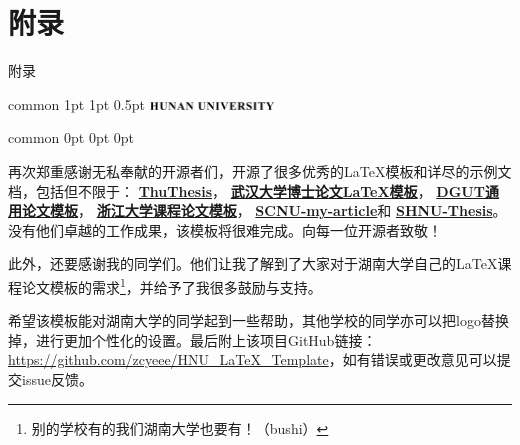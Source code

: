 \documentclass[
    report,     %
    oneside,    %
    UTF8,       %
    zihao=-4    %
]{config} %
\begin{document}



\begin{references}
\end{references}


\StartAppendix %

\chapter{附录}

附录


\Header
    {common} %
    {1pt} %
    {1pt} %
    {0.5pt} %
    {} %
    {\includegraphics[width=0.25\textwidth]{figures/logos/HNU-title-EN.png}} %
    {} %


\Footer
    {common} %
    {0pt} %
    {0pt} %
    {0pt} %
    {} %
    {\thepage} %
    {} %




\StartAcknowledgements %

再次郑重感谢无私奉献的开源者们，开源了很多优秀的\LaTeX{}模板和详尽的示例文档，包括但不限于：
\href{https://github.com/tuna/thuthesis}{\textbf{ThuThesis}}，
\href{http://aff.whu.edu.cn/huangzh/}{\textbf{武汉大学博士论文\LaTeX{}模板}}，
\href{https://www.overleaf.com/latex/templates/dguttong-yong-lun-wen-slash-bao-gao-slash-zuo-ye-mo-ban-fei-guan-fang/gkymcyhwhjhj}{\textbf{DGUT通用论文模板}}，
\href{https://www.overleaf.com/latex/templates/zhe-jiang-da-xue-ke-cheng-lun-wen-mo-ban/mjpzqvgsmdzn}{\textbf{浙江大学课程论文模板}}，
\href{https://www.overleaf.com/latex/templates/scnu-my-article/jkbbvhnddtsw}{\textbf{SCNU-my-article}}和
\href{https://www.overleaf.com/latex/templates/shnu-thesis/wsykzrksspgn}{\textbf{SHNU-Thesis}}。
没有他们卓越的工作成果，该模板将很难完成。向每一位开源者致敬！

此外，还要感谢我的同学们。他们让我了解到了大家对于湖南大学自己的\LaTeX{}课程论文模板的需求\footnote{别的学校有的我们湖南大学也要有！（bushi）}，并给予了我很多鼓励与支持。

希望该模板能对湖南大学的同学起到一些帮助，其他学校的同学亦可以把logo替换掉，进行更加个性化的设置。最后附上该项目GitHub链接：\url{https://github.com/zcyeee/HNU_LaTeX_Template}，如有错误或更改意见可以提交issue反馈。
\end{document}

